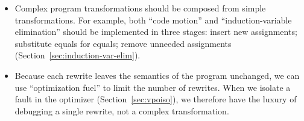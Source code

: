 \documentclass[blockstyle,preprint,natbib,nocopyrightspace]{sigplanconf}
\newcommand\secref[1]{Section~\ref{sec:#1}}
\begin{document}
\begin{itemize}
\item
Complex program transformations should be composed from simple
transformations. 
For example, both ``code motion'' and ``induction-variable
elimination'' should be implemented in three stages: insert new assignments;
substitute equals for equals; remove unneeded assignments
(\secref{induction-var-elim}). 

\item 
Because each rewrite leaves the semantics
of the program unchanged, 
we can use 
``optimization fuel'' to limit the number of rewrites.
 When we isolate a fault in the optimizer
(\secref{vpoiso}), we therefore have the luxury of debugging a single
 rewrite, not a complex transformation.
\end{itemize}
\end{document}
